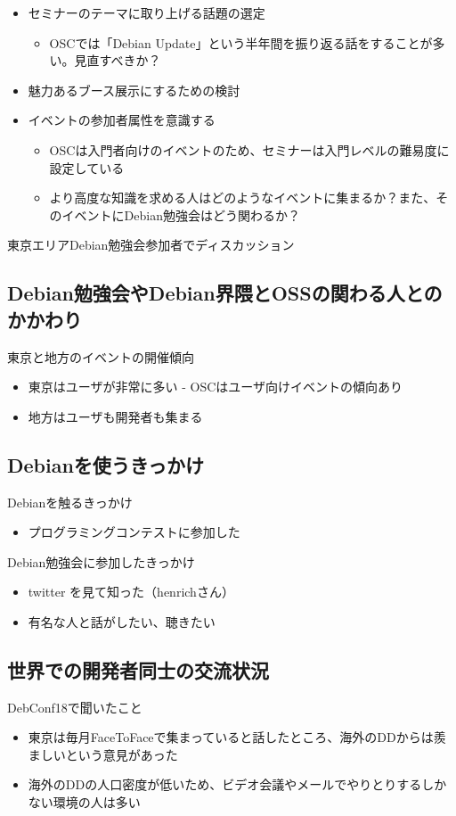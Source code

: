 \documentclass[mingoth,a4paper]{jsarticle}
\begin{document}
\begin{itemize}
\item セミナーのテーマに取り上げる話題の選定
  \begin{itemize}
  \item OSCでは「Debian Update」という半年間を振り返る話をすることが多い。見直すべきか？
  \end{itemize}
\item 魅力あるブース展示にするための検討
\item イベントの参加者属性を意識する
  \begin{itemize}
  \item OSCは入門者向けのイベントのため、セミナーは入門レベルの難易度に設定している
  \item より高度な知識を求める人はどのようなイベントに集まるか？また、そのイベントにDebian勉強会はどう関わるか？
  \end{itemize}
\end{itemize}


東京エリアDebian勉強会参加者でディスカッション

\subsection{Debian勉強会やDebian界隈とOSSの関わる人とのかかわり}

東京と地方のイベントの開催傾向
\begin{itemize}
\item 東京はユーザが非常に多い
    - OSCはユーザ向けイベントの傾向あり
\item 地方はユーザも開発者も集まる
\end{itemize}
\subsection{Debianを使うきっかけ}
Debianを触るきっかけ
\begin{itemize}
\item プログラミングコンテストに参加した
\end{itemize}
Debian勉強会に参加したきっかけ
\begin{itemize}
\item twitter を見て知った（henrichさん）
\item 有名な人と話がしたい、聴きたい
\end{itemize}
\subsection{世界での開発者同士の交流状況}
DebConf18で聞いたこと
\begin{itemize}
\item 東京は毎月FaceToFaceで集まっていると話したところ、海外のDDからは羨ましいという意見があった
\item 海外のDDの人口密度が低いため、ビデオ会議やメールでやりとりするしかない環境の人は多い
\end{itemize}
\end{document}
